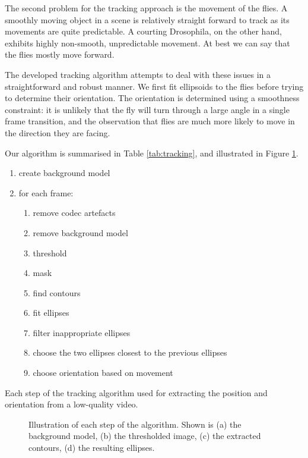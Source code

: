 \documentclass[twocolumn]{article}
\begin{document}
The second problem for the tracking approach is the movement of the flies. A smoothly moving object in a scene is relatively straight forward to track as its movements are quite predictable. A courting Drosophila, on the other hand, exhibits highly non-smooth, unpredictable movement. At best we can say that the flies mostly move forward. 

The developed tracking algorithm attempts to deal with these issues in a straightforward and robust manner. We first fit ellipsoids to the flies before trying to determine their orientation. The orientation is determined using a smoothness constraint: it is unlikely that the fly will turn through a large angle in a single frame transition, and the observation that flies are much more likely to move in the direction they are facing.

Our algorithm is summarised in Table \ref{tab:tracking}, and illustrated in Figure \ref{fig:tracking}. 

\begin{table}
\begin{enumerate}
	\item create background model
	\item for each frame:
	\begin{enumerate}
		\item remove codec artefacts
		\item remove background model
		\item threshold
		\item mask
		\item find contours
		\item fit ellipses
		\item filter inappropriate ellipses
		\item choose the two ellipses closest to the previous ellipses
		\item choose orientation based on movement
	\end{enumerate}
\end{enumerate}
\label{tab:tracking}
\caption{Each step of the tracking algorithm used for extracting the position and orientation from a low-quality video.}
\end{table}

\begin{figure}
	
	\caption{Illustration of each step of the algorithm. Shown is (a) the background model, (b) the thresholded image, (c) the extracted contours, (d) the resulting ellipses.}
	\label{fig:tracking}
\end{figure}
\end{document}
